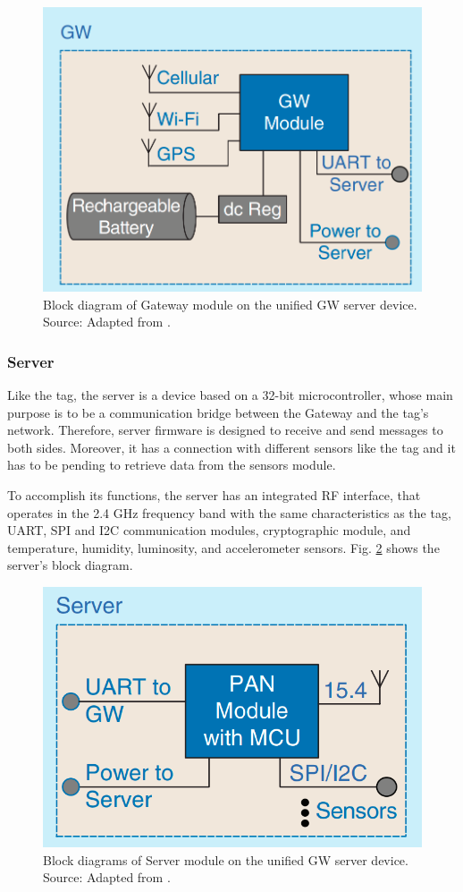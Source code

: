 \documentclass[journal]{IEEEtran}	%
\begin{document}
\begin{figure}[t!]
\centering
\includegraphics[width=0.9\columnwidth]{fig4.png}
\caption{Block diagram of Gateway module on the unified GW server device. Source: Adapted from \cite{williams2017weaving}.}
\label{fig:gateway}
\end{figure}


\subsubsection{Server}


Like the tag, the server is a device based on a 32-bit microcontroller, whose main purpose is to be a communication bridge between the Gateway and the tag's network. Therefore, server firmware is designed to receive and send messages to both sides. Moreover, it has a connection with different sensors like the tag and it has to be pending to retrieve data from the sensors module.

To accomplish its functions, the server has an integrated RF interface, that operates in the 2.4 GHz frequency band with the same characteristics as the tag, UART, SPI and I2C communication modules, cryptographic module, and temperature, humidity, luminosity, and accelerometer sensors. Fig. \ref{fig:server} shows the server's block diagram.

\begin{figure}[t!]
\centering
\includegraphics[width=0.9\columnwidth]{fig5.png}
\caption{Block diagrams of Server module on the unified GW server device. Source: Adapted from \cite{williams2017weaving}.}
\label{fig:server}
\end{figure}
\end{document}

